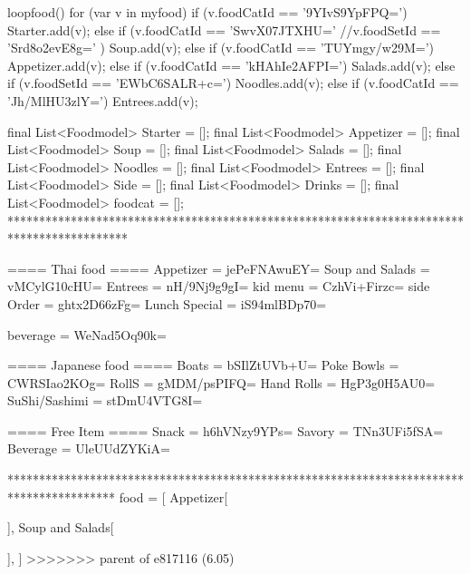                     loopfood() {
                        for (var v in myfood) {
                          if (v.foodCatId == '9YIvS9YpFPQ=') {
                            Starter.add(v);
                          } else if (v.foodCatId == 'SwvX07JTXHU=' //v.foodSetId == 'Srd8o2evE8g='
                              ) {
                            Soup.add(v);
                          } else if (v.foodCatId == 'TUYmgy/w29M=') {
                            Appetizer.add(v);
                          } else if (v.foodCatId == 'kHAhIe2AFPI=') {
                            Salads.add(v);
                          } else if (v.foodSetId == 'EWbC6SALR+c=') {
                            Noodles.add(v);
                          } else if (v.foodCatId == 'Jh/MlHU3zlY=') {
                            Entrees.add(v);
                          }
                        }
                      }

                      final List<Foodmodel> Starter = [];
                      final List<Foodmodel> Appetizer = [];
                      final List<Foodmodel> Soup = [];
                      final List<Foodmodel> Salads = [];
                      final List<Foodmodel> Noodles = [];
                      final List<Foodmodel> Entrees = [];
                      final List<Foodmodel> Side = [];
                      final List<Foodmodel> Drinks = [];
                      final List<Foodmodel> foodcat = [];
*******************************************************************************************

==== Thai food ====
Appetizer = jePeFNAwuEY=
Soup and Salads = vMCylG10cHU=
Entrees = nH/9Nj9g9gI=
kid menu = CzhVi+Firzc=
side Order = ghtx2D66zFg=
Lunch Special = iS94mlBDp70=


beverage = WeNad5Oq90k=


==== Japanese food ====
Boats = bSIlZtUVb+U=
Poke Bowls = CWRSIao2KOg=
RollS = gMDM/psPIFQ=
Hand Rolls = HgP3g0H5AU0=
SuShi/Sashimi = stDmU4VTG8I=

==== Free Item ====
Snack = h6hVNzy9YPs=
Savory = TNn3UFi5fSA=
Beverage = UleUUdZYKiA=


*****************************************************************************************
food = [
    Appetizer[

    ],
    Soup and Salads[

    ],
]
>>>>>>> parent of e817116 (6.05)
